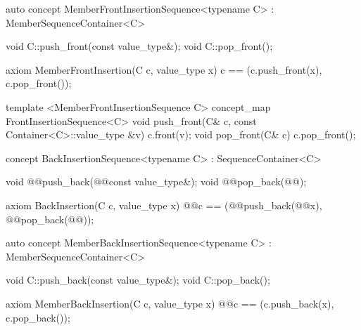 \documentclass[american,twoside]{book}
\begin{document}
\begin{itemdescr}
\pnum
{}
\end{itemdescr}

\begin{itemdecl}
auto concept MemberFrontInsertionSequence<typename C> : MemberSequenceContainer<C> {
  void C::push_front(const value_type&);
  void C::pop_front();

  axiom MemberFrontInsertion(C c, value_type x) {
    c == (c.push_front(x), c.pop_front());
  }
}
\end{itemdecl}


\begin{itemdescr}
\pnum
{}
\end{itemdescr}

\begin{itemdecl}
template <MemberFrontInsertionSequence C> 
concept_map FrontInsertionSequence<C> {
  void push_front(C& c, const Container<C>::value_type &v)   { c.front(v); }
  void pop_front(C& c)                                       { c.pop_front(); }
}			
\end{itemdecl}

\begin{itemdecl}
concept BackInsertionSequence<typename C> : SequenceContainer<C> {
  void @@push_back(@@const value_type&);
  void @@pop_back(@@);

  axiom BackInsertion(C c, value_type x) {
    @\textcolor{addclr}{}@c == (@@push_back(@@x), @@pop_back(@@));
  }
}
\end{itemdecl}


\begin{itemdescr}
\pnum
{}
\end{itemdescr}


\begin{itemdecl}
auto concept MemberBackInsertionSequence<typename C> : MemberSequenceContainer<C> {
  void C::push_back(const value_type&);
  void C::pop_back();

  axiom MemberBackInsertion(C c, value_type x) {
    @\textcolor{addclr}{}@c == (c.push_back(x), c.pop_back());
  }
}
\end{itemdecl}
\end{document}
